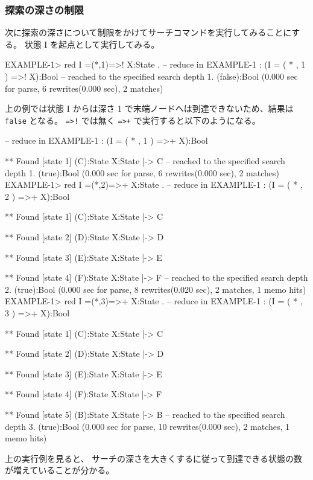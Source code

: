 \documentclass{article}
\begin{document}
\subsubsection{探索の深さの制限}
次に探索の深さについて制限をかけてサーチコマンドを実行してみることにする。
状態 I を起点として実行してみる。
\begin{simplev}
EXAMPLE-1> red I =(*,1)=>! X:State .
-- reduce in EXAMPLE-1 : (I = ( * , 1 ) =>! X):Bool
-- reached to the specified search depth 1.
(false):Bool
(0.000 sec for parse, 6 rewrites(0.000 sec), 2 matches)
\end{simplev}
上の例では状態 I からは深さ 1 で末端ノードへは到達できないため、結果は \texttt{false} となる。
\texttt{=>!} では無く \texttt{=>+} で実行すると以下のようになる。
\begin{simplev}
-- reduce in EXAMPLE-1 : (I = ( * , 1 ) =>+ X):Bool

** Found [state 1] (C):State
   { X:State |-> C }
-- reached to the specified search depth 1.
(true):Bool
(0.000 sec for parse, 6 rewrites(0.000 sec), 2 matches)
EXAMPLE-1> red I =(*,2)=>+ X:State .
-- reduce in EXAMPLE-1 : (I = ( * , 2 ) =>+ X):Bool

** Found [state 1] (C):State
   { X:State |-> C }

** Found [state 2] (D):State
   { X:State |-> D }

** Found [state 3] (E):State
   { X:State |-> E }

** Found [state 4] (F):State
   { X:State |-> F }
-- reached to the specified search depth 2.
(true):Bool
(0.000 sec for parse, 8 rewrites(0.020 sec), 2 matches, 1 memo hits)
EXAMPLE-1> red I =(*,3)=>+ X:State .
-- reduce in EXAMPLE-1 : (I = ( * , 3 ) =>+ X):Bool

** Found [state 1] (C):State
   { X:State |-> C }

** Found [state 2] (D):State
   { X:State |-> D }

** Found [state 3] (E):State
   { X:State |-> E }

** Found [state 4] (F):State
   { X:State |-> F }

** Found [state 5] (B):State
   { X:State |-> B }
-- reached to the specified search depth 3.
(true):Bool
(0.000 sec for parse, 10 rewrites(0.000 sec), 2 matches, 1 memo hits)
\end{simplev}
上の実行例を見ると、
サーチの深さを大きくするに従って到達できる状態の数が増えていることが分かる。
\end{document}
